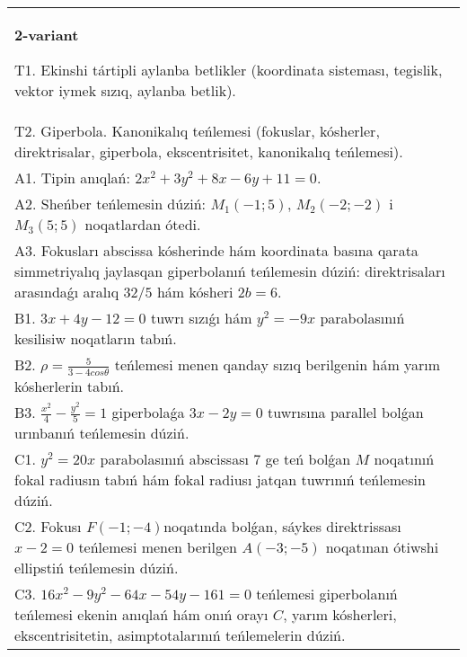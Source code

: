 \documentclass{article}
\begin{document}
\begin{tabular}{m{17cm}}
\textbf{2-variant}
\newline

T1. Ekinshi tártipli aylanba betlikler (koordinata sisteması, tegislik, vektor iymek sızıq, aylanba betlik).\\

T2. Giperbola. Kanonikalıq teńlemesi (fokuslar, kósherler, direktrisalar, giperbola, ekscentrisitet, kanonikalıq teńlemesi).\\

A1. Tipin anıqlań: $2 x^{2}+3 y^{2}+8 x-6 y+11=0$.\\

A2. Sheńber teńlemesin dúziń: $M_1 (-1;5) $, $M_2 (-2;-2) $ i $M_3 (5;5) $ noqatlardan ótedi.\\

A3. Fokusları abscissa kósherinde hám koordinata basına qarata simmetriyalıq jaylasqan giperbolanıń teńlemesin dúziń: direktrisaları arasındaǵı aralıq $32/5$ hám kósheri $2 b=6$.\\

B1. $3x + 4y - 12 = 0$ tuwrı sızıǵı hám $y^{2} = - 9x$ parabolasınıń kesilisiw noqatların tabıń.  \\

B2. $\rho = \frac{5}{3 - 4cos\theta}$ teńlemesi menen qanday sızıq berilgenin hám yarım kósherlerin tabıń.  \\

B3. $\frac{x^{2}}{4} - \frac{y^{2}}{5} = 1$ giperbolaǵa $3x - 2y = 0$ tuwrısına parallel bolǵan urınbanıń teńlemesin dúziń.  \\

C1. $y^{2} = 20x$ parabolasınıń abscissası 7 ge teń bolǵan $M$ noqatınıń fokal radiusın tabıń hám fokal radiusı jatqan tuwrınıń teńlemesin dúziń.  \\

C2. Fokusı $F( - 1; - 4)$noqatında bolǵan, sáykes direktrissası $x - 2 = 0$ teńlemesi menen berilgen $A( - 3; - 5)$ noqatınan ótiwshi ellipstiń teńlemesin dúziń.  \\

C3. $16x^{2} - 9y^{2} - 64x - 54y - 161 = 0$ teńlemesi giperbolanıń teńlemesi ekenin anıqlań hám onıń orayı $C$, yarım kósherleri, ekscentrisitetin, asimptotalarınıń teńlemelerin dúziń.  \\

\end{tabular}
\vspace{1cm}
\end{document}
